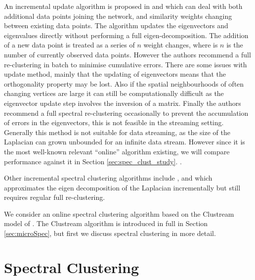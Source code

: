An incremental update algorithm is proposed in \cite{Ning2007} and  \cite{Ning2010} which can deal with both additional data points joining the network, and similarity weights changing between existing data points. The algorithm updates the eigenvectors and eigenvalues directly without performing a full eigen-decomposition. The addition of a new data point is treated as a series of $n$ weight changes, where is $n$ is the number of currently observed data points.  However the authors recommend a full re-clustering in batch to minimise cumulative errors. There are some issues with update method, mainly that the updating of eigenvectors means that the orthogonality property may be lost. Also if the spatial neighbourhoods of often changing vertices are large it can still be computationally difficult as the eigenvector update step involves the inversion of a matrix. Finally the authors recommend a full spectral re-clustering occasionally to prevent the accumulation of errors in the eigenvectors, this is not feasible in the streaming setting. Generally this method is not suitable for data streaming, as the size of the Laplacian can grown unbounded for an infinite data stream. However since it is the most well-known relevant ``online'' algorithm existing, we will compare performance against it in Section \ref{sec:spec_clust_study}.  .

Other incremental spectral clustering algorithms include \cite{Kong2011}, \cite{Langone2014} and \cite{Dhanjal2011} which approximates the eigen decomposition of the Laplacian incrementally but still requires regular full re-clustering.


We consider an online spectral clustering algorithm based on the Clustream model of \cite{Aggarwal2003}. The Clustream algorithm is introduced in full in Section \ref{sec:microSpec}, but first we discuss spectral clustering in more detail.

\section{Spectral Clustering}
\label{sec:spec}

